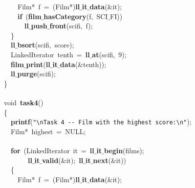 \documentclass{article}
\begin{document}
\mbox{}\ \ \ \ Film*\ f\ =\ (Film*)\textbf{ll$\_$it$\_$data}(\&it); \\
\mbox{}\ \ \ \ \textbf{if}\ (\textbf{film$\_$hasCategory}(f,\ SCI$\_$FI)) \\
\mbox{}\ \ \ \ \ \ \textbf{ll$\_$push$\_$front}(scifi,\ f); \\
\mbox{}\ \ \} \\
\mbox{}\ \ \textbf{ll$\_$bsort}(scifi,\ score); \\
\mbox{}\ \ LinkedIterator\ tenth\ =\ \textbf{ll$\_$at}(scifi,\ 9); \\
\mbox{}\ \ \textbf{film$\_$print}(\textbf{ll$\_$it$\_$data}(\&tenth)); \\
\mbox{}\ \ \textbf{ll$\_$purge}(scifi); \\
\mbox{}\} \\
\mbox{} \\
\mbox{}void\ \textbf{task4}() \\
\mbox{}\{ \\
\mbox{}\ \ \textbf{printf}(\texttt{"{}}\texttt{\textbackslash{}n}\texttt{Task\ 4\ -\/-\ Film\ with\ the\ highest\ score:}\texttt{\textbackslash{}n}\texttt{"{}}); \\
\mbox{}\ \ Film*\ highest\ =\ NULL; \\
\mbox{} \\
\mbox{}\ \ \textbf{for}\ (LinkedIterator\ it\ =\ \textbf{ll$\_$it$\_$begin}(films); \\
\mbox{}\ \ \ \ \ \ \ \textbf{ll$\_$it$\_$valid}(\&it);\ \textbf{ll$\_$it$\_$next}(\&it)) \\
\mbox{}\ \ \{ \\
\mbox{}\ \ \ \ Film*\ f\ =\ (Film*)\textbf{ll$\_$it$\_$data}(\&it); \\
\end{document}
